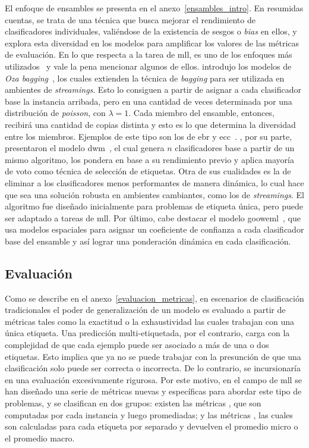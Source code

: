 El enfoque de ensambles se presenta en el anexo~\ref{ensambles_intro}. En
resumidas cuentas, se trata de una técnica que busca mejorar el rendimiento de
clasificadores individuales, valiéndose de la existencia de sesgos o
\textit{bias} en ellos, y explora esta diversidad en los modelos para amplificar
los valores de las métricas de evaluación. En lo que respecta a la tarea de
\acrshort{mll}, es uno de los enfoques más
utilizados~\cite{herrera_multilabel_2016} y vale la pena mencionar algunos de
ellos.  \citeauthor{oza_online_2005} introdujo los modelos de \textit{Oza
	bagging}~\cite{oza_online_2005}, los cuales extienden la técnica de
\textit{bagging} para ser utilizada en ambientes de \textit{streamings}. Esto lo
consiguen a partir de asignar a cada clasificador base la instancia arribada,
pero en una cantidad de veces determinada por una distribución de
\textit{poisson}, con $\lambda = 1$. Cada miembro del ensamble, entonces,
recibirá una cantidad de copias distinta y esto es lo que determina la
diversidad entre los miembros. Ejemplos de este tipo son los de \acrfull{ebr} y
\acrfull{ecc}~\cite{read_classifier_2011}.  \citeauthor{kolter_dynamic_2007},
por su parte, presentaron el modelo \acrfull{dwm}~\cite{kolter_dynamic_2007}, el
cual genera $n$ clasificadores base a partir de un mismo algoritmo, los pondera
en base a su rendimiento previo y aplica mayoría de voto como técnica de
selección de etiquetas. Otra de sus cualidades es la de eliminar a los
clasificadores menos performantes de manera dinámica, lo cual hace que sea una
solución robusta en ambientes cambiantes, como los de \textit{streamings}. El
algoritmo fue diseñado inicialmente para problemas de etiqueta única, pero puede
ser adaptado a tareas de \acrshort{mll}. Por último, cabe destacar el modelo
\acrshort{gooweml}~\cite{buyukcakir_novel_2018}, que usa modelos espaciales para
asignar un coeficiente de confianza a cada clasificador base del ensamble y así
lograr una ponderación dinámica en cada clasificación.

\subsection{Evaluación}
\label{mll_evaluacion}

Como se describe en el anexo~\ref{evaluacion_metricas}, en escenarios de
clasificación tradicionales el poder de generalización de un modelo es evaluado
a partir de métricas tales como la exactitud o la exhaustividad las cuales
trabajan con una única etiqueta. Una predicción multi-etiquetada, por el
contrario, carga con la complejidad de que cada ejemplo puede ser asociado a más
de una o dos etiquetas. Esto implica que ya no se puede trabajar con la
presunción de que una clasificación solo puede ser correcta o incorrecta. De lo
contrario, se incursionaría en una evaluación excesivamente rigurosa. Por este
motivo, en el campo de \acrshort{mll} se han diseñado una serie de métricas
nuevas y específicas para abordar este tipo de problemas, y se clasifican en dos
grupos: existen las métricas , que son computadas
por cada instancia y luego promediadas; y las métricas , las cuales son calculadas para cada etiqueta por separado y
devuelven el promedio micro o el promedio macro.

